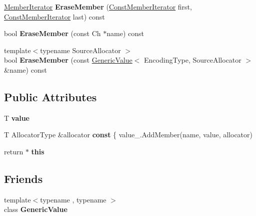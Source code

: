 \begin{DoxyCompactItemize}
\item 
\hyperlink{a00118}{Member\+Iterator} {\bfseries Erase\+Member} (\hyperlink{a00118}{Const\+Member\+Iterator} first, \hyperlink{a00118}{Const\+Member\+Iterator} last) const \hypertarget{a00120_a04c3ce4a9076ab2f7e8f6c5031456c29}{}\label{a00120_a04c3ce4a9076ab2f7e8f6c5031456c29}

\item 
bool {\bfseries Erase\+Member} (const Ch $\ast$name) const \hypertarget{a00120_abcf63f10bbc634620e03bf8b375fa6fd}{}\label{a00120_abcf63f10bbc634620e03bf8b375fa6fd}

\item 
{\footnotesize template$<$typename Source\+Allocator $>$ }\\bool {\bfseries Erase\+Member} (const \hyperlink{a00130}{Generic\+Value}$<$ Encoding\+Type, Source\+Allocator $>$ \&name) const \hypertarget{a00120_afda9d121d16de8b70f7bf09621851218}{}\label{a00120_afda9d121d16de8b70f7bf09621851218}

\end{DoxyCompactItemize}
\subsection*{Public Attributes}
\begin{DoxyCompactItemize}
\item 
T {\bfseries value}\hypertarget{a00120_a131538fbbacbc0a3a5ad15dbea66394f}{}\label{a00120_a131538fbbacbc0a3a5ad15dbea66394f}

\item 
T Allocator\+Type \&allocator {\bfseries const} \{ value\+\_\+.\+Add\+Member(name, value, allocator)\hypertarget{a00120_af70c9646b5e422306c33e98b3d8783a7}{}\label{a00120_af70c9646b5e422306c33e98b3d8783a7}

\item 
return $\ast$ {\bfseries this}\hypertarget{a00120_a719a0e5501da825e6f86ce12b46446cb}{}\label{a00120_a719a0e5501da825e6f86ce12b46446cb}

\end{DoxyCompactItemize}
\subsection*{Friends}
\begin{DoxyCompactItemize}
\item 
{\footnotesize template$<$typename , typename $>$ }\\class {\bfseries Generic\+Value}\hypertarget{a00120_a899449e1a645b5e377af059fb61113d8}{}\label{a00120_a899449e1a645b5e377af059fb61113d8}

\end{DoxyCompactItemize}


